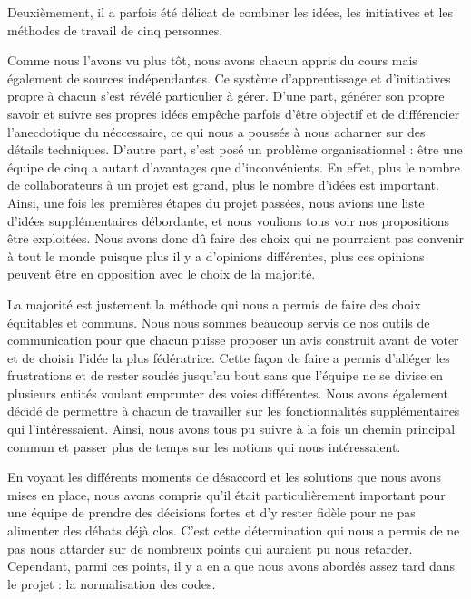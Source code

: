 \documentclass[12pt]{report}
\begin{document}
        \bigskip
        \par
        Deuxièmement, il a parfois été délicat de combiner les idées, les initiatives et les méthodes de travail de cinq personnes.
        \par
        Comme nous l’avons vu plus tôt, nous avons chacun appris du cours mais également de sources indépendantes. Ce système d’apprentissage et d’initiatives propre à chacun s’est révélé particulier à gérer. D’une part, générer son propre savoir et suivre ses propres idées empêche parfois d’être objectif et de différencier l’anecdotique du néccessaire, ce qui nous a poussés à nous acharner sur des détails techniques. D’autre part, s’est posé un problème organisationnel : être une équipe de cinq a autant d’avantages que d’inconvénients. En effet, plus le nombre de collaborateurs à un projet est grand, plus le nombre d’idées est important. Ainsi, une fois les premières étapes du projet passées, nous avions une liste d’idées supplémentaires débordante, et nous voulions tous voir nos propositions être exploitées. Nous avons donc dû faire des choix qui ne pourraient pas convenir à tout le monde puisque plus il y a d’opinions différentes, plus ces opinions peuvent être en opposition avec le choix de la majorité.
        \par
        La majorité est justement la méthode qui nous a permis de faire des choix équitables et communs. Nous nous sommes beaucoup servis de nos outils de communication pour que chacun puisse proposer un avis construit avant de voter et de choisir l’idée la plus fédératrice. Cette façon de faire a permis d’alléger les frustrations et de rester soudés jusqu’au bout sans que l’équipe ne se divise en plusieurs entités voulant emprunter des voies différentes. Nous avons également décidé de permettre à chacun de travailler sur les fonctionnalités supplémentaires qui l’intéressaient. Ainsi, nous avons tous pu suivre à la fois un chemin principal commun et passer plus de temps sur les notions qui nous intéressaient.
        \par
        En voyant les différents moments de désaccord et les solutions que nous avons mises en place, nous avons compris qu’il était particulièrement important pour une équipe de prendre des décisions fortes et d’y rester fidèle pour ne pas alimenter des débats déjà clos. C’est cette détermination qui nous a permis de ne pas nous attarder sur de nombreux points qui auraient pu nous retarder. Cependant, parmi ces points, il y a en a que nous avons abordés assez tard dans le projet : la normalisation des codes.
        
\end{document}
